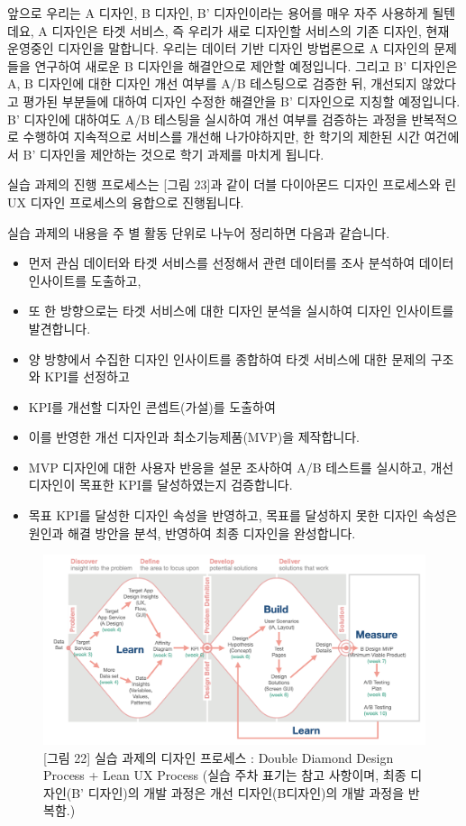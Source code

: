 \documentclass[
  letterpaper,
]{book}
\providecommand{\tightlist}{%
  \setlength{\itemsep}{0pt}\setlength{\parskip}{0pt}}\usepackage{longtable,booktabs,array}
\begin{document}
앞으로 우리는 A 디자인, B 디자인, B' 디자인이라는 용어를 매우 자주
사용하게 될텐데요, A 디자인은 타겟 서비스, 즉 우리가 새로 디자인할
서비스의 기존 디자인, 현재 운영중인 디자인을 말합니다. 우리는 데이터
기반 디자인 방법론으로 A 디자인의 문제들을 연구하여 새로운 B 디자인을
해결안으로 제안할 예정입니다. 그리고 B' 디자인은 A, B 디자인에 대한
디자인 개선 여부를 A/B 테스팅으로 검증한 뒤, 개선되지 않았다고 평가된
부분들에 대하여 디자인 수정한 해결안을 B' 디자인으로 지칭할 예정입니다.
B' 디자인에 대하여도 A/B 테스팅을 실시하여 개선 여부를 검증하는 과정을
반복적으로 수행하여 지속적으로 서비스를 개선해 나가야하지만, 한 학기의
제한된 시간 여건에서 B' 디자인을 제안하는 것으로 학기 과제를 마치게
됩니다.

실습 과제의 진행 프로세스는 {[}그림 23{]}과 같이 더블 다이아몬드 디자인
프로세스와 린 UX 디자인 프로세스의 융합으로 진행됩니다.

실습 과제의 내용을 주 별 활동 단위로 나누어 정리하면 다음과 같습니다.

\begin{itemize}
\tightlist
\item
  먼저 관심 데이터와 타겟 서비스를 선정해서 관련 데이터를 조사 분석하여
  데이터 인사이트를 도출하고,
\item
  또 한 방향으로는 타겟 서비스에 대한 디자인 분석을 실시하여 디자인
  인사이트를 발견합니다.
\item
  양 방향에서 수집한 디자인 인사이트를 종합하여 타겟 서비스에 대한
  문제의 구조와 KPI를 선정하고
\item
  KPI를 개선할 디자인 콘셉트(가설)를 도출하여
\item
  이를 반영한 개선 디자인과 최소기능제품(MVP)을 제작합니다.
\item
  MVP 디자인에 대한 사용자 반응을 설문 조사하여 A/B 테스트를 실시하고,
  개선 디자인이 목표한 KPI를 달성하였는지 검증합니다.
\item
  목표 KPI를 달성한 디자인 속성을 반영하고, 목표를 달성하지 못한 디자인
  속성은 원인과 해결 방안을 분석, 반영하여 최종 디자인을 완성합니다.
\end{itemize}

\begin{figure}[H]

{\centering \includegraphics{img/fig22.png}

}

\caption{{[}그림 22{]} 실습 과제의 디자인 프로세스 : Double Diamond
Design Process + Lean UX Process (실습 주차 표기는 참고 사항이며, 최종
디자인(B' 디자인)의 개발 과정은 개선 디자인(B디자인)의 개발 과정을
반복함.)}

\end{figure}%
\end{document}
